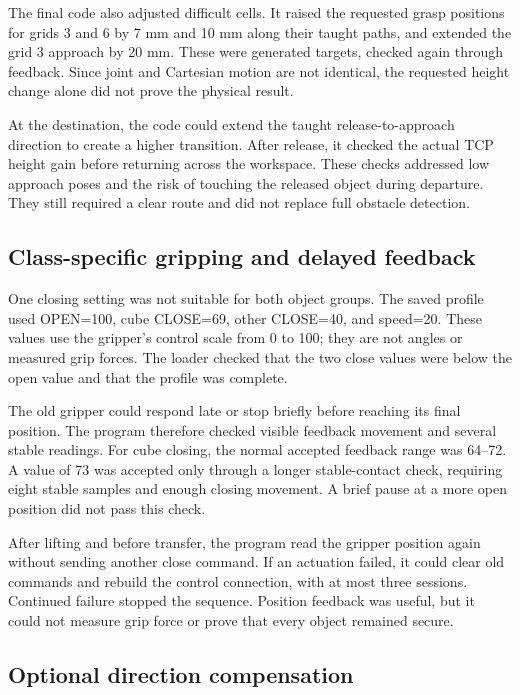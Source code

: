 The final code also adjusted difficult cells. It raised the requested grasp positions for grids 3 and 6 by 7 mm and 10 mm along their taught paths, and extended the grid 3 approach by 20 mm. These were generated targets, checked again through feedback. Since joint and Cartesian motion are not identical, the requested height change alone did not prove the physical result.

At the destination, the code could extend the taught release-to-approach direction to create a higher transition. After release, it checked the actual TCP height gain before returning across the workspace. These checks addressed low approach poses and the risk of touching the released object during departure. They still required a clear route and did not replace full obstacle detection.

\subsection{Class-specific gripping and delayed feedback}

One closing setting was not suitable for both object groups. The saved profile used OPEN=100, cube CLOSE=69, other CLOSE=40, and speed=20. These values use the gripper's control scale from 0 to 100; they are not angles or measured grip forces. The loader checked that the two close values were below the open value and that the profile was complete.

The old gripper could respond late or stop briefly before reaching its final position. The program therefore checked visible feedback movement and several stable readings. For cube closing, the normal accepted feedback range was 64--72. A value of 73 was accepted only through a longer stable-contact check, requiring eight stable samples and enough closing movement. A brief pause at a more open position did not pass this check.

After lifting and before transfer, the program read the gripper position again without sending another close command. If an actuation failed, it could clear old commands and rebuild the control connection, with at most three sessions. Continued failure stopped the sequence. Position feedback was useful, but it could not measure grip force or prove that every object remained secure.

\subsection{Optional direction compensation}

